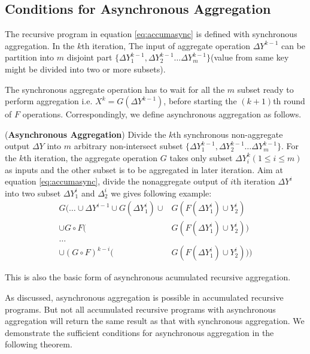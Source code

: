 {\subsection{Conditions for Asynchronous Aggregation}
\label{sec:async:condition}
The recursive program in equation \ref{eq:accumasync} is defined with synchronous aggregation. 
In the $k$th iteration, The input of aggregate operation  $\Delta Y^{k-1}$ can be partition into $m$ disjoint part $\{\Delta Y_1^{k-1},\Delta Y_2^{k-1}\ldots \Delta Y_m^{k-1} \}$(value from same key might be divided into two or more subsets).
 
The synchronous aggregate operation has to wait for all the $m$ subset ready to perform aggregation i.e. $X^k=G(\Delta Y^{k-1})$, before starting the $(k+1)$th round of $F$ operations.  Correspondingly, we define asynchronous aggregation as follows.
\begin{definition}(\textbf{Asynchronous Aggregation})
	\label{def:asyncaggre}
	Divide the $k$th synchronous non-aggregate output $\Delta Y$ into $m$ arbitrary non-intersect subset $\{\Delta Y_1^{k-1},\Delta Y_2^{k-1}\ldots \Delta Y_m^{k-1} \}$. For the $k$th iteration, the aggregate operation $G$ takes only subset $\Delta Y_{i}^k(1\le i\le m)$ as inputs and the other subset is to be aggregated in later iteration.
     Aim at equation \ref{eq:accumasync}, divide the nonaggregate output of $i$th iteration $\Delta Y^i$ into two subset $\Delta Y^i_1$ and $\Delta^i_2$ we gives following example:
     \begin{equation}
     \begin{aligned}
	G\big(\ldots \cup \Delta Y^{i-1}\cup G(\Delta Y^i_1)  \cup &G(F(\Delta Y^i_1)\cup Y^i_2)\\
	 \cup G\circ F(&G(F(\Delta Y^i_1)\cup Y^i_2)) \\
	\ldots\\
	\cup (G\circ F)^{k-i}(&G(F(\Delta Y^i_1)\cup Y^i_2))\big)
	\end{aligned}
	\end{equation}
\end{definition}
This is also the basic form of asynchronous acumulated recursive aggregation. 

As discussed, asynchronous aggregation is possible in accumulated recursive programs. But not all  accumulated recursive programs with asynchronous aggregation will return the same result as that with synchronous aggregation. We demonstrate the sufficient conditions for asynchronous aggregation in the following theorem.

}
